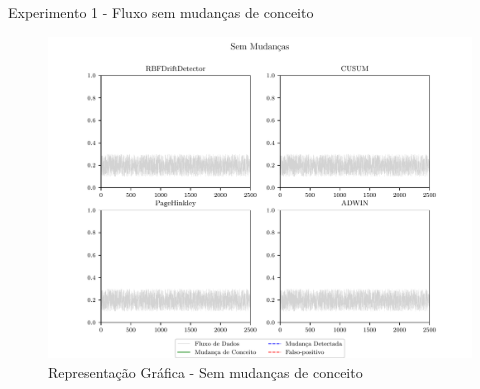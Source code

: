 \documentclass[10pt]{beamer}
\begin{document}
\begin{frame}{Experimento 1 - Fluxo sem mudanças de conceito}
\begin{figure}[ht]
    \begin{center}
        \includegraphics[scale=0.45]{../text/imagens/nochange.pdf}
        \caption{Representação Gráfica - Sem mudanças de conceito}
        \label{fig:exp_sem_mudancas}
    \end{center}
\end{figure}
\end{frame}
\end{document}
